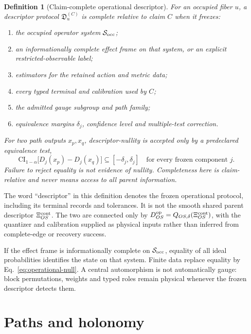 \documentclass[11pt]{article}
\newtheorem{definition}{Definition}
\begin{document}
\begin{definition}[Claim-complete operational descriptor]
For an occupied fiber \(u\), a descriptor protocol
\(\mathfrak D_u^{(C)}\) is complete relative to claim \(C\) when it freezes:
\begin{enumerate}[label=(D\arabic*)]
 \item the occupied operator system \(\mathcal S_{\rm occ}\);
 \item an informationally complete effect frame on that system, or an explicit
 restricted-observable label;
 \item estimators for the retained action and metric data;
 \item every typed terminal and calibration used by \(C\);
 \item the admitted gauge subgroup and path family;
 \item equivalence margins \(\delta_j\), confidence level and multiple-test
 correction.
\end{enumerate}
For two path outputs \(x_p,x_q\), descriptor-nullity is accepted only by a
predeclared equivalence test,
\begin{equation}
 \mathrm{CI}_{1-\alpha}\bigl[D_j(x_p)-D_j(x_q)\bigr]
 \subseteq[-\delta_j,\delta_j]
 \quad\text{for every frozen component }j.
 \label{eq:operational-null}
\end{equation}
Failure to reject equality is not evidence of nullity.  Completeness here is
claim-relative and never means access to all parent information.
\end{definition}

The word ``descriptor'' in this definition denotes the frozen operational
protocol, including its terminal records and tolerances. It is not the smooth
shared parent descriptor $\Xi_{OS}^{\rm cont}$. The two are connected only
by $D_{OS}^{\rm op}=Q_{OS,\delta}(\Xi_{OS}^{\rm cont})$, with the quantizer
and calibration supplied as physical inputs rather than inferred from
complete-edge or recovery success.

If the effect frame is informationally complete on
\(\mathcal S_{\rm occ}\), equality of all ideal probabilities identifies the
state on that system.  Finite data replace equality by
Eq.~\eqref{eq:operational-null}.  A central automorphism is not automatically
gauge: block permutations, weights and typed roles remain physical whenever
the frozen descriptor detects them.

\section{Paths and holonomy}
\end{document}
